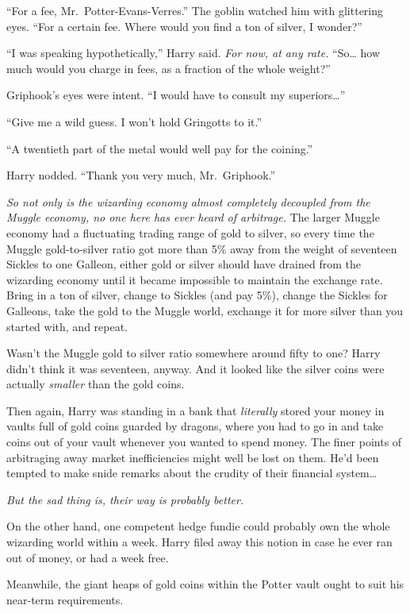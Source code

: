 ``For a fee, Mr.~Potter-Evans-Verres.'' The goblin watched him with
glittering eyes. ``For a certain fee. Where would you find a ton of
silver, I wonder?''

``I was speaking hypothetically,'' Harry said. \emph{For now, at any
rate.} ``So\ldots{} how much would you charge in fees, as a fraction of
the whole weight?''

Griphook's eyes were intent. ``I would have to consult my
superiors\ldots{}''

``Give me a wild guess. I won't hold Gringotts to it.''

``A twentieth part of the metal would well pay for the coining.''

Harry nodded. ``Thank you very much, Mr.~Griphook.''

\emph{So not only is the wizarding economy almost completely decoupled
from the Muggle economy, no one here has ever heard of arbitrage.} The
larger Muggle economy had a fluctuating trading range of gold to silver,
so every time the Muggle gold-to-silver ratio got more than 5\% away
from the weight of seventeen Sickles to one Galleon, either gold or
silver should have drained from the wizarding economy until it became
impossible to maintain the exchange rate. Bring in a ton of silver,
change to Sickles (and pay 5\%), change the Sickles for Galleons, take
the gold to the Muggle world, exchange it for more silver than you
started with, and repeat.

Wasn't the Muggle gold to silver ratio somewhere around fifty to one?
Harry didn't think it was seventeen, anyway. And it looked like the
silver coins were actually \emph{smaller} than the gold coins.

Then again, Harry was standing in a bank that \emph{literally} stored
your money in vaults full of gold coins guarded by dragons, where you
had to go in and take coins out of your vault whenever you wanted to
spend money. The finer points of arbitraging away market inefficiencies
might well be lost on them. He'd been tempted to make snide remarks
about the crudity of their financial system\ldots{}

\emph{But the sad thing is, their way is probably better.}

On the other hand, one competent hedge fundie could probably own the
whole wizarding world within a week. Harry filed away this notion in
case he ever ran out of money, or had a week free.

Meanwhile, the giant heaps of gold coins within the Potter vault ought
to suit his near-term requirements.

